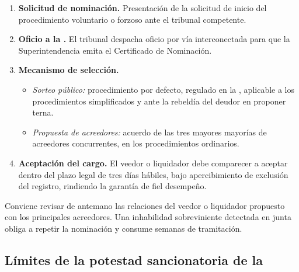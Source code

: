 \begin{enumerate}
  \item \textbf{Solicitud de nominación.} Presentación de la solicitud de inicio del
  procedimiento voluntario o forzoso ante el tribunal competente.

  \item \textbf{Oficio a la \superir{}.} El tribunal despacha oficio por vía
  interconectada para que la Superintendencia emita el Certificado de Nominación.

  \item \textbf{Mecanismo de selección.}
  \begin{itemize}
    \item \emph{Sorteo público:} procedimiento por defecto, regulado en la  \citeyearpar{ncg-17},
    aplicable a los procedimientos simplificados y ante la rebeldía del deudor en
    proponer terna.
    \item \emph{Propuesta de acreedores:} acuerdo de las tres mayores mayorías de
    acreedores concurrentes, en los procedimientos ordinarios.
  \end{itemize}

  \item \textbf{Aceptación del cargo.} El veedor o liquidador debe comparecer a aceptar
  dentro del plazo legal de tres días hábiles, bajo apercibimiento de exclusión del
  registro, rindiendo la garantía de fiel desempeño.
\end{enumerate}


\begin{practica}
Conviene revisar de antemano las relaciones del veedor o liquidador propuesto con los
principales acreedores. Una inhabilidad sobreviniente detectada en junta obliga a repetir
la nominación y consume semanas de tramitación.
\end{practica}

\bloqueJurisprudencial

\subsection{Límites de la potestad sancionatoria de la \superir{}}

